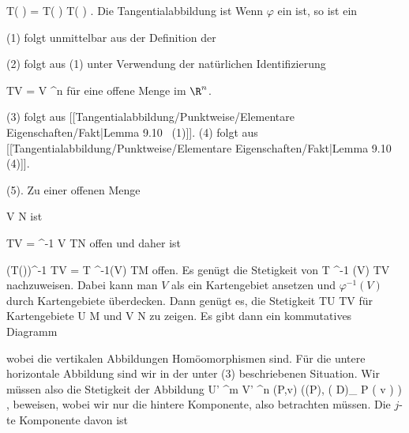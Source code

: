 {{{\mavergleichskettedisp
{\vergleichskette
{ T( \varphi \circ \psi)
}
{ =} { T( \varphi) \circ T( \psi)
}
{ } {
}
{ } {
}
{ } {
}
}
{}{}{.}
}{Die Tangentialabbildung
 ist
}{Wenn $\varphi$ ein
ist, so ist
 ein
}}
\faktzusatz {}
\faktzusatz {}

}
{

\teilbeweis {}{}{}
{(1) folgt unmittelbar aus der Definition der
}
{}
\teilbeweis {}{}{}
{(2) folgt aus (1) unter Verwendung der natürlichen Identifizierung

\mavergleichskette
{\vergleichskette
{ TV
}
{ = }{ V \times \R^n
}
{  }{
}
{    }{
}
{   }{
}
}
{}{}{}
für eine offene Menge im $\R^n$.}
{}
\teilbeweis {}{}{}
{(3) folgt aus
[[Tangentialabbildung/Punktweise/Elementare Eigenschaften/Fakt|Lemma 9.10  (1)]].}
{}
\teilbeweis {}{}{}
{(4) folgt aus
[[Tangentialabbildung/Punktweise/Elementare Eigenschaften/Fakt|Lemma 9.10  (4)]].}
{}
\teilbeweis {}{}{}
{(5). Zu einer offenen Menge

\mavergleichskettedisp
{\vergleichskette
{ V
}
{ \subseteq} { N
}
{ } {
}
{ } {
}
{ } {
}
}
{}{}{}
ist

\mavergleichskette
{\vergleichskette
{ TV
}
{ = }{ \pi^{-1} V
}
{ \subseteq }{ TN
}
{    }{
}
{   }{
}
}
{}{}{}
offen und daher ist

\mavergleichskette
{\vergleichskette
{ (T(\varphi))^{-1} TV
}
{ = }{ T \varphi^{-1}(V)
}
{ \subseteq }{ TM
}
{    }{
}
{   }{
}
}
{}{}{}
offen. Es genügt die Stetigkeit von
\maabbdisp {} {T \varphi^{-1} (V)} {TV
} {}
nachzuweisen. Dabei kann man $V$ als ein Kartengebiet ansetzen und $\varphi^{-1}(V)$ durch Kartengebiete überdecken. Dann genügt es, die Stetigkeit
\maabbdisp {} {TU} {TV
} {}
für Kartengebiete
\mathkor {} {U \subseteq M} {und} {V \subseteq N} {}
zu zeigen. Es gibt dann ein kommutatives Diagramm

 {  }
 wobei die vertikalen Abbildungen Homöomorphismen sind. Für die untere horizontale Abbildung sind wir in der unter (3) beschriebenen Situation. Wir müssen also die Stetigkeit der Abbildung
\maabbeledisp {} {U' \times \R^m } { V' \times \R^n
} {(P,v)} { (\varphi(P), \left(  D\varphi  \right)_{ P } \left(  v  \right) )
} {,}
beweisen, wobei wir nur die hintere Komponente, also
  betrachten müssen. Die $j$-te Komponente davon ist

}}
